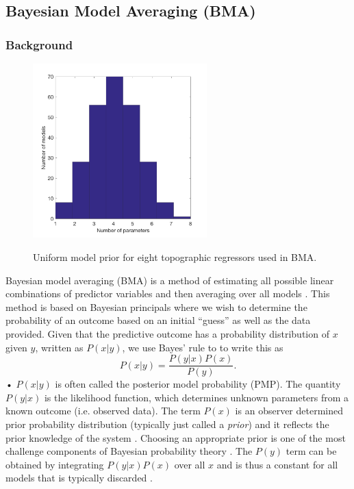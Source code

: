 \documentclass[12pt]{article}
\begin{document}
\subsection{Bayesian Model Averaging (BMA)}
\label{sec:BMS}

\subsubsection{Background}

\begin{figure}
	\centering
	\includegraphics[width = 0.6\textwidth]{DistributionOfNumParams_topoRegress.png}\\
	\caption{Uniform model prior for eight topographic regressors used in BMA.}
	\label{fig:uni_model_prior}
\end{figure}

Bayesian model averaging (BMA) is a method of estimating all possible linear combinations of predictor variables and then averaging over all models \citep{Raftery1997, Wasserman2000, Raftery2005}.  This method is based on Bayesian principals where we wish to determine the probability of an outcome based on an initial ``guess'' as well as the data provided. Given that the predictive outcome has a probability distribution of $x$ given $y$, written as $P(x|y)$, we use Bayes' rule to to write this as
\begin{equation}
P(x|y) = \frac{P(y|x)P(x)}{P(y)}.
\end{equation}•
$P(x|y)$ is often called the posterior model probability (PMP). The quantity $P(y|x)$ is the likelihood function, which determines unknown parameters from a known outcome (i.e. observed data). The term $P(x)$ is an observer determined prior probability distribution (typically just called a \textit{prior}) and it reflects the prior knowledge of the system \citep{Raftery1997}. Choosing an appropriate prior is one of the most challenge components of Bayesian probability theory \citep{Wasserman2000}. The $P(y)$ term can be obtained by integrating $P(y|x)P(x)$ over all $x$ and is thus a constant for all models that is typically discarded \citep{Wasserman2000}. 
\end{document}
